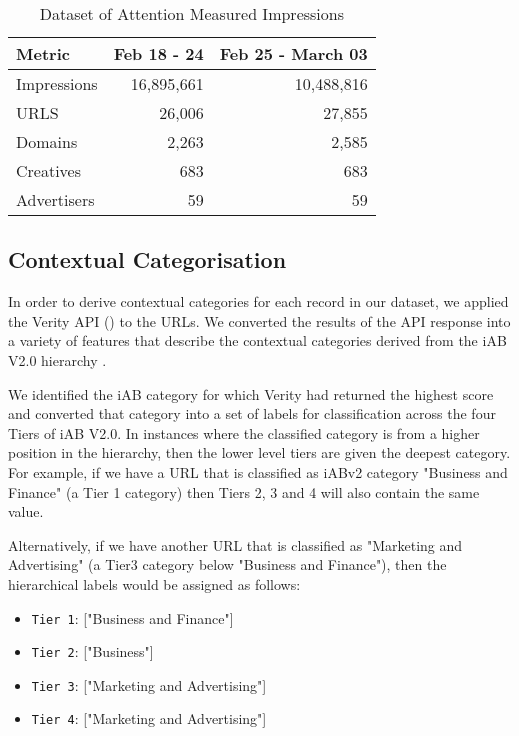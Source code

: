 \documentclass[sigconf]{acmart}
\begin{document}
\begin{table}
\caption{Dataset of Attention Measured Impressions}
\label{tab:dataset}
\begin{tabular}{|l|r|r|}
\toprule
Metric          &Feb 18 - 24    &Feb 25 - March 03          \\
\midrule
Impressions     &16,895,661     &10,488,816     \\
URLS            &26,006         &27,855         \\
Domains         &2,263          &2,585          \\
Creatives       &683            &683            \\
Advertisers     &59             &59             \\
\bottomrule
\end{tabular}
\end{table}

\subsection{Contextual Categorisation}

In order to derive contextual categories for each record in our dataset,
we applied the Verity API (\citeauthor{verity}) to the URLs. We converted the results of
the API response into a variety of features that describe the contextual
categories derived from the iAB V2.0 hierarchy \cite{iabv2}.

We identified the iAB category for which Verity had returned the
highest score and converted that category into a set of labels for
classification across the four Tiers of iAB V2.0. In instances where the
classified category is from a higher position in the hierarchy, then the
lower level tiers are given the deepest category. For example, if we have
a URL that is classified as iABv2 category "Business and Finance"
(a Tier 1 category) then Tiers 2, 3 and 4 will also contain the same value.

Alternatively, if we have another URL that is classified as "Marketing and Advertising"
(a Tier3 category below "Business and Finance"), then the hierarchical labels
would be assigned as follows:

\begin{itemize}
    \item {\texttt{Tier 1}}: ["Business and Finance"]
    \item {\texttt{Tier 2}}: ["Business"]
    \item {\texttt{Tier 3}}: ["Marketing and Advertising"]
    \item {\texttt{Tier 4}}: ["Marketing and Advertising"]
\end{itemize}
\end{document}
